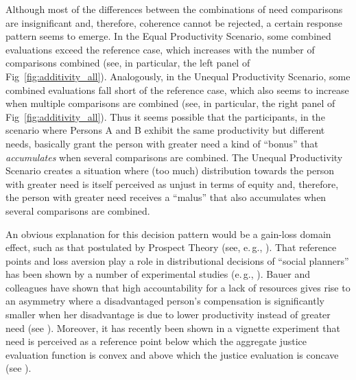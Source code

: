 \documentclass[10pt,letterpaper]{article}
\begin{document}
Although most of the differences between the combinations of need comparisons are insignificant and, therefore, coherence cannot be rejected, a certain response pattern seems to emerge.
In the Equal Productivity Scenario, some combined evaluations exceed the reference case, which increases with the number of comparisons combined (see, in particular, the left panel of Fig~\ref{fig:additivity_all}).
Analogously, in the Unequal Productivity Scenario, some combined evaluations fall short of the reference case, which also seems to increase when multiple comparisons are combined (see, in particular, the right panel of Fig~\ref{fig:additivity_all}).
Thus it seems possible that the participants, in the scenario where Persons A and B exhibit the same productivity but different needs, basically grant the person with greater need a kind of ``bonus'' that \textit{accumulates} when several comparisons are combined.
The Unequal Productivity Scenario creates a situation where (too much) distribution towards the person with greater need is itself perceived as unjust in terms of equity and, therefore, the person with greater need receives a ``malus'' that also accumulates when several comparisons are combined.

An obvious explanation for this decision pattern would be a gain-loss domain effect, such as that postulated by Prospect Theory (see, e.\,g., \cite{kahneman_prospect_1979,tversky_loss_1991}).
That reference points and loss aversion play a role in distributional decisions of ``social planners'' has been shown by a number of experimental studies (e.\,g., \cite{charite_reference_2022}).
Bauer and colleagues have shown that high accountability for a lack of resources gives rise to an asymmetry where a disadvantaged person's compensation is significantly smaller when her disadvantage is due to lower productivity instead of greater need (see \cite{bauer_need_2022}).
Moreover, it has recently been shown in a vignette experiment that need is perceived as a reference point below which the aggregate justice evaluation function is convex and above which the justice evaluation is concave (see \cite{bauer_poorest_2023}).


\end{document}
